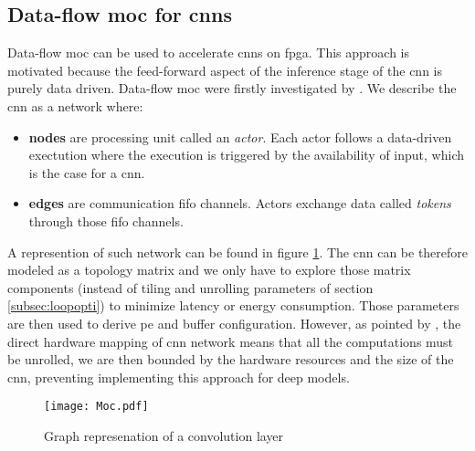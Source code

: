 \subsection{Data-flow \acrshort{moc} for \acrshort{cnn}s}
%
%
Data-flow \acrfull{moc} can be used to accelerate \acrshort{cnn}s on \acrshort{fpga}. This approach is motivated because the feed-forward aspect of the inference stage of the \acrshort{cnn} is purely data driven.
Data-flow \acrfull{moc} were firstly investigated by \cite{lin_li_low_2016}.  We describe the \acrshort{cnn} as a network where:
\begin{itemize}
    \item \textbf{nodes} are processing unit called an \textit{actor}. Each actor follows a data-driven exectution where the execution is triggered by the availability of input, which is the case for a \acrshort{cnn}.
    \item \textbf{edges} are communication \acrshort{fifo} channels. Actors exchange data called \textit{tokens} through those \acrshort{fifo} channels.
\end{itemize}
A represention of such network can be found in figure \ref{fig:moc}. \newline \newline
The \acrshort{cnn} can be therefore modeled as a topology matrix and we only have to explore those matrix components (instead of tiling and unrolling parameters of section \ref{subsec:loopopti}) to minimize latency or energy consumption. Those parameters are then used to derive \acrshort{pe} and buffer configuration. However, as pointed by \cite{abdelouahab_tactics_2017}, the direct hardware mapping of \acrshort{cnn} network means that all the computations must be unrolled, we are then bounded by the hardware resources and the size of the \acrshort{cnn}, preventing implementing this approach for deep models.
\begin{figure}
    \centering
    \texttt{[image: Moc.pdf]}
    \caption{Graph represenation of a convolution layer}
    \label{fig:moc}
\end{figure}
%
%
